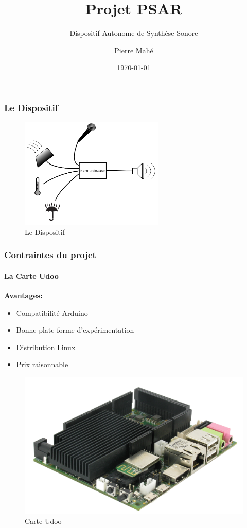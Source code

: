 \documentclass{beamer}
\title{Projet PSAR}
\subtitle{Dispositif Autonome de Synthèse Sonore}
\institute{Encadrant : Hugues Genevois}
\author{Pierre Mahé}
\date{\today}
\begin{document}
\begin{frame}
\titlepage
\end{frame}
\begin{frame}
\frametitle{Le Dispositif}
\begin{figure}
  \centering
  \includegraphics[height=200px]{schemagrobal.jpg} 
	\caption{Le Dispositif}
	
\end{figure}\end{frame}

\begin{frame}
\frametitle{Contraintes du projet}
\framesubtitle{La Carte Udoo}
\begin{minipage}{0.49\textwidth}
\textbf{Avantages:}
\begin{itemize}
\item Compatibilité Arduino
\item Bonne plate-forme d’expérimentation
\item Distribution Linux
\item Prix raisonnable
\end{itemize}
\end{minipage}
\begin{minipage}{0.49\textwidth}
\begin{figure}
  \centering
  \includegraphics[width=\textwidth]{udoo.jpg} 
	\caption{Carte Udoo}
\end{figure}
\end{minipage}
\end{frame}
\end{document}
